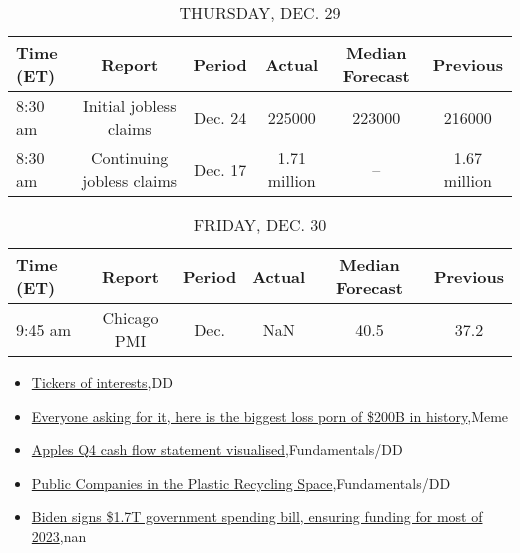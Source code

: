\documentclass{article}%
\begin{document}
%


\begin{table}[htbp]%
\caption{THURSDAY, DEC. 29}%
\centering%
\begin{adjustbox}{width=1\textwidth}%
\begin{tabular}{lccccc}
\toprule
Time (ET) &                    Report &  Period &       Actual & Median Forecast &     Previous \\
\midrule
  8:30 am &    Initial jobless claims & Dec. 24 &       225000 &          223000 &       216000 \\
  8:30 am & Continuing jobless claims & Dec. 17 & 1.71 million &              -- & 1.67 million \\
\bottomrule
\end{tabular}
%
\end{adjustbox}%
\end{table}

%


\begin{table}[htbp]%
\caption{FRIDAY, DEC. 30}%
\centering%
\begin{adjustbox}{width=1\textwidth}%
\begin{tabular}{lccccc}
\toprule
Time (ET) &      Report & Period & Actual & Median Forecast & Previous \\
\midrule
  9:45 am & Chicago PMI &   Dec. &    NaN &            40.5 &     37.2 \\
\bottomrule
\end{tabular}
%
\end{adjustbox}%
\end{table}

%
\begin{itemize}%
\item%
\href{https://reddit.com/r/wallstreetbets/comments/zyzdmh/tickers\_of\_interests/}{Tickers of interests},DD%
\item%
\href{https://reddit.com/r/wallstreetbets/comments/zyyvys/everyone\_asking\_for\_it\_here\_is\_the\_biggest\_loss/}{Everyone asking for it, here is the biggest loss porn of \$200B in history},Meme%
\item%
\href{https://reddit.com/r/StockMarket/comments/zyxdor/apples\_q4\_cash\_flow\_statement\_visualised/}{Apples Q4 cash flow statement visualised},Fundamentals/DD%
\item%
\href{https://reddit.com/r/StockMarket/comments/zyu0zc/public\_companies\_in\_the\_plastic\_recycling\_space/}{Public Companies in the Plastic Recycling Space},Fundamentals/DD%
\item%
\href{https://reddit.com/r/Economics/comments/zyugrs/biden\_signs\_17t\_government\_spending\_bill\_ensuring/}{Biden signs \$1.7T government spending bill, ensuring funding for most of 2023},nan%
\end{itemize}%
\end{document}
